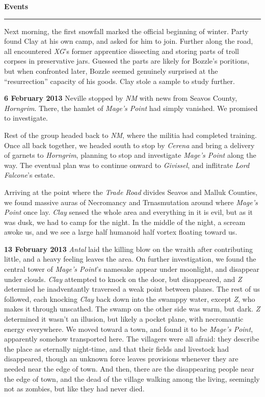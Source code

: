 \documentclass[letterpaper]{article}
\newcommand{\e}[1]{\emph{#1}}
\newcommand{\B}[1]{\textbf{#1}}
\newenvironment{notesection}[1]
{ {\huge \B{#1}}\hrule\vspace{0.5em}\begingroup\fontsize{9pt}{12pt}\selectfont}
{\endgroup}
\begin{document}
\begin{notesection}{Events}
Next morning, the first snowfall marked the official beginning of winter.  Party found Clay at his own camp, and asked for him to join.  Further along the road, all encountered \e{XG}'s former apprentice dissecting and storing parts of troll corpses in preservative jars.  Guessed the parts are likely for Bozzle's poritions, but when confronted later, Bozzle seemed genuinely surprised at the ``resurrection'' capacity of his goods.  Clay stole a sample to study further.

\B{6 February 2013} Neville stopped by \e{NM} with news from Seavos County, \e{Horngrim}.  There, the hamlet of \e{Mage's Point} had simply vanished.  We promised to investigate.

Rest of the group headed back to \e{NM}, where the militia had completed training. Once all back together, we headed south to stop by \e{Cerena} and bring a delivery of garnets to \e{Horngrim}, planning to stop and investigate \e{Mage's Point} along the way.  The eventual plan was to continue onward to \e{Givissel}, and inflitrate \e{Lord Falcone}'s estate.

Arriving at the point where the \e{Trade Road} divides Seavos and Malluk Counties, we found massive auras of Necromancy and Trnasmutation around where \e{Mage's Point} once lay. \e{Clay} sensed the whole area and everything in it is evil, but as it was dusk, we had to camp for the night.  In the middle of the night, a scream awoke us, and we see a large half humanoid half vortex floating toward us.

\B{13 February 2013} \e{Antal} laid the killing blow on the wraith after contributing little, and a heavy feeling leaves the area.  On further investigation, we found the central tower of \e{Mage's Point}'s namesake appear under moonlight, and disappear under clouds.  \e{Clay} attempted to knock on the door, but disappeared, and \e{Z} determied he inadventantly traversed a weak point between planes. The rest of us followed, each knocking \e{Clay} back down into the swamppy water, except \e{Z}, who makes it through unscathed. The swamp on the other side was warm, but dark. \e{Z} determined it wasn't an illusion, but likely a pocket plane, with necromantic energy everywhere. We moved toward a town, and found it to be \e{Mage's Point}, apparently somehow transported here.  The villagers were all afraid: they describe the place as eternally night-time, and that their fields and livestock had disappeared, though an unknown force leaves provisions whenever they are needed near the edge of town.  And then, there are the disappearing people near the edge of town, and the dead of the village walking among the living, seemingly not as zombies, but like they had never died.


\end{notesection}
\end{document}

